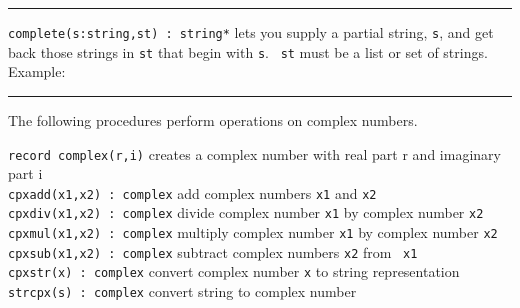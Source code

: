 \vspace{0.25cm}\hrule{}

\texttt{complete(s:string,st) : string*} lets you
supply a partial string, \texttt{s}, and get back those strings in
\texttt{st} that begin with \texttt{s}. \ \texttt{st} must be a list or
set of strings. Example:


\vspace{0.25cm}\hrule{}

The following procedures perform operations on complex numbers. 

\noindent \texttt{record complex(r,i)} creates a complex number with real part r
and imaginary part i\\
\texttt{cpxadd(x1,x2) : complex} add complex numbers \texttt{x1} and
\texttt{x2}\\
\texttt{cpxdiv(x1,x2) : complex} divide complex number \texttt{x1} by
complex number \texttt{x2}\\
\texttt{cpxmul(x1,x2) : complex} multiply complex number \texttt{x1} by
complex number \texttt{x2}\\
\texttt{cpxsub(x1,x2) : complex} subtract complex numbers \texttt{x2}
from \ \texttt{x1}\\
\texttt{cpxstr(x) : complex} convert complex number \texttt{x} to string
representation\\
\texttt{strcpx(s) : complex} convert string to complex number 

